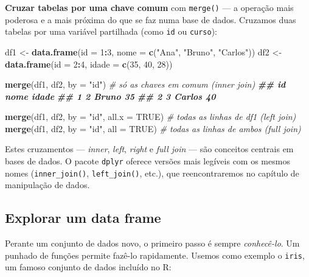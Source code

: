 \documentclass[
  portuguese,
  11pt,
  openany]{book}
\newenvironment{Shaded}{\begin{snugshade}}{\end{snugshade}}
\newcommand{\AttributeTok}[1]{\textcolor[rgb]{0.13,0.29,0.53}{#1}}
\newcommand{\CommentTok}[1]{\textcolor[rgb]{0.56,0.35,0.01}{\textit{#1}}}
\newcommand{\ConstantTok}[1]{\textcolor[rgb]{0.56,0.35,0.01}{#1}}
\newcommand{\DecValTok}[1]{\textcolor[rgb]{0.00,0.00,0.81}{#1}}
\newcommand{\DocumentationTok}[1]{\textcolor[rgb]{0.56,0.35,0.01}{\textbf{\textit{#1}}}}
\newcommand{\FunctionTok}[1]{\textcolor[rgb]{0.13,0.29,0.53}{\textbf{#1}}}
\newcommand{\NormalTok}[1]{#1}
\newcommand{\OtherTok}[1]{\textcolor[rgb]{0.56,0.35,0.01}{#1}}
\newcommand{\SpecialCharTok}[1]{\textcolor[rgb]{0.81,0.36,0.00}{\textbf{#1}}}
\newcommand{\StringTok}[1]{\textcolor[rgb]{0.31,0.60,0.02}{#1}}
\begin{document}
\textbf{Cruzar tabelas por uma chave comum} com \texttt{merge()} --- a operação mais poderosa e
a mais próxima do que se faz numa base de dados. Cruzamos duas tabelas por uma
variável partilhada (como \texttt{id} ou \texttt{curso}):

\begin{Shaded}
\begin{Highlighting}[]
\NormalTok{df1 }\OtherTok{\textless{}{-}} \FunctionTok{data.frame}\NormalTok{(}\AttributeTok{id =} \DecValTok{1}\SpecialCharTok{:}\DecValTok{3}\NormalTok{, }\AttributeTok{nome =} \FunctionTok{c}\NormalTok{(}\StringTok{"Ana"}\NormalTok{, }\StringTok{"Bruno"}\NormalTok{, }\StringTok{"Carlos"}\NormalTok{))}
\NormalTok{df2 }\OtherTok{\textless{}{-}} \FunctionTok{data.frame}\NormalTok{(}\AttributeTok{id =} \DecValTok{2}\SpecialCharTok{:}\DecValTok{4}\NormalTok{, }\AttributeTok{idade =} \FunctionTok{c}\NormalTok{(}\DecValTok{35}\NormalTok{, }\DecValTok{40}\NormalTok{, }\DecValTok{28}\NormalTok{))}

\FunctionTok{merge}\NormalTok{(df1, df2, }\AttributeTok{by =} \StringTok{"id"}\NormalTok{)                 }\CommentTok{\# só as chaves em comum (inner join)}
\DocumentationTok{\#\#   id   nome idade}
\DocumentationTok{\#\# 1  2  Bruno    35}
\DocumentationTok{\#\# 2  3 Carlos    40}

\FunctionTok{merge}\NormalTok{(df1, df2, }\AttributeTok{by =} \StringTok{"id"}\NormalTok{, }\AttributeTok{all.x =} \ConstantTok{TRUE}\NormalTok{)   }\CommentTok{\# todas as linhas de df1 (left join)}
\FunctionTok{merge}\NormalTok{(df1, df2, }\AttributeTok{by =} \StringTok{"id"}\NormalTok{, }\AttributeTok{all =} \ConstantTok{TRUE}\NormalTok{)     }\CommentTok{\# todas as linhas de ambos (full join)}
\end{Highlighting}
\end{Shaded}

Estes cruzamentos --- \emph{inner}, \emph{left}, \emph{right} e \emph{full join} --- são conceitos
centrais em bases de dados. O pacote \texttt{dplyr} oferece versões mais legíveis com os
mesmos nomes (\texttt{inner\_join()}, \texttt{left\_join()}, etc.), que reencontraremos no
capítulo de manipulação de dados.

\subsection{Explorar um data frame}\label{explorar-um-data-frame}

Perante um conjunto de dados novo, o primeiro passo é sempre \emph{conhecê-lo}. Um
punhado de funções permite fazê-lo rapidamente. Usemos como exemplo o \texttt{iris}, um
famoso conjunto de dados incluído no R:
\end{document}
